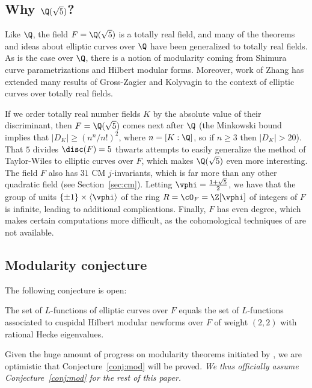 \documentclass{amsart}
\begin{document}
 
\subsection{Why $\Q(\sqrt{5})$?}

Like $\Q$, the field $F=\Q(\sqrt{5})$ is a totally real field, and
many of the theorems and ideas about elliptic curves over $\Q$ have
been generalized to totally real fields. As is the case over $\Q$,
there is a notion of modularity coming from Shimura curve
parametrizations and Hilbert modular forms.
Moreover, work of Zhang \cite{zhang:heightsshimura}  has extended many
results of Gross-Zagier \cite{gross-zagier} and Kolyvagin
\cite{kolyvagin:mordellweil} to the context of elliptic curves over
totally real fields.

If we order totally real number fields $K$ by the absolute value of
their discriminant, then $F=\Q(\sqrt{5})$ comes next after $\Q$ (the
Minkowski bound implies that $|D_K| \geq (n^n/n!)^2$, where
$n=[K:\Q]$, so if $n\geq 3$ then $|D_K|>20$). That $5$ divides
$\disc(F)=5$ thwarts attempts to easily generalize the
method of Taylor-Wiles to elliptic curves over $F$, which makes
$\Q(\sqrt{5})$ even more interesting.
The field $F$ also has $31$ CM $j$-invariants, which is far more than
 any other quadratic field (see Section~\ref{sec:cm}).  Letting
 $\vphi=\frac{1+\sqrt{5}}{2}$, we have that the group of units
 $\{\pm 1\} \times \langle \vphi \rangle$ of the
ring $R=\cO_F=\Z[\vphi]$ of integers of $F$ is infinite, leading to
additional complications.  Finally, $F$ has even degree, which
makes certain computations more difficult, as the cohomological
techniques of \cite{greenberg-voight:shimura} are not available. 


\subsection{Modularity conjecture}\label{sec:mod}
The following conjecture is open:
\begin{conjecture}[Modularity]\label{conj:mod}
  The set of $L$-functions of elliptic curves over $F$ equals the set
  of $L$-functions associated to cuspidal Hilbert modular newforms
  over $F$ of weight $(2,2)$ with rational Hecke eigenvalues.
\end{conjecture}
Given the huge amount of progress on modularity theorems initiated by
\cite{wiles:fermat}, we are optimistic that Conjecture~\ref{conj:mod}
will be proved.  {\em We thus officially assume
  Conjecture~\ref{conj:mod} for the rest of this paper.} \\
\end{document}
